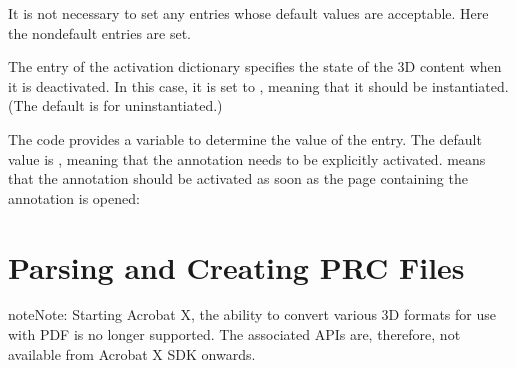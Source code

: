\documentclass[letterpaper,12pt,english,openany,oneside]{sphinxmanual}
\begin{document}
It is not necessary to set any entries whose default values are acceptable. Here the non\sphinxhyphen{}default entries are set.

The  entry of the activation dictionary specifies the state of the 3D content when it is deactivated. In this case, it is set to , meaning that it should be instantiated. (The default is  for uninstantiated.)

\begin{sphinxVerbatim}[commandchars=\\\{\}]
  
        
\end{sphinxVerbatim}

The code provides a variable to determine the value of the  entry. The default value is , meaning that the annotation needs to be explicitly activated.  means that the annotation should be activated as soon as the page containing the annotation is opened:

\begin{sphinxVerbatim}[commandchars=\\\{\}]
   
   
      
            
\end{sphinxVerbatim}


\chapter{Parsing and Creating PRC Files}
\label{\detokenize{Plugins_A3D_API:parsing-and-creating-prc-files}}\label{\detokenize{Plugins_A3D_API::doc}}
\begin{sphinxadmonition}{note}{Note:}
Starting Acrobat X, the ability to convert various 3D formats for use with PDF is no longer supported. The associated APIs are, therefore, not available from Acrobat X SDK onwards.
\end{sphinxadmonition}
\end{document}
